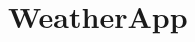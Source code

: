 \chapter{Weather\+App}
\hypertarget{md__r_e_a_d_m_e}{}\label{md__r_e_a_d_m_e}
\label{md__r_e_a_d_m_e_autotoc_md0}%
%

